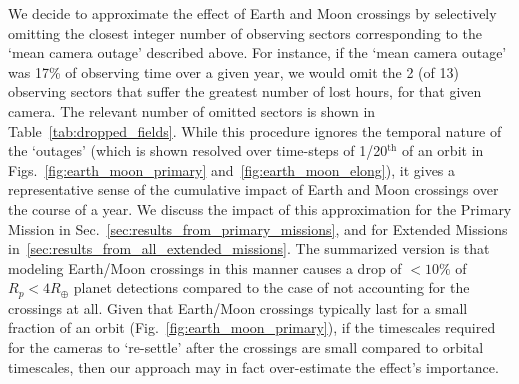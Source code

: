 We decide to approximate the effect of Earth and Moon crossings by selectively omitting the closest integer number of observing sectors corresponding to the `mean camera outage' described above.
For instance, if the `mean camera outage' was 17\% of \tesss observing time over a given year, we would omit the 2 (of 13) observing sectors that suffer the greatest number of lost hours, for that given camera.
The relevant number of omitted sectors is shown in Table~\ref{tab:dropped_fields}.
While this procedure ignores the temporal nature of the `outages' (which is shown resolved over time-steps of 1/20$^\mathrm{th}$ of an orbit in Figs.~\ref{fig:earth_moon_primary} and~\ref{fig:earth_moon_elong}), it gives a representative sense of the cumulative impact of Earth and Moon crossings over the course of a year.
We discuss the impact of this approximation for the Primary Mission in Sec.~\ref{sec:results_from_primary_missions}, and for Extended Missions in~\ref{sec:results_from_all_extended_missions}.
The summarized version is that modeling Earth/Moon crossings in this manner causes a drop of $<10\%$ of $R_p < 4R_\oplus$ planet detections compared to the case of not accounting for the crossings at all.
Given that Earth/Moon crossings typically last for a small fraction of an orbit (Fig.~\ref{fig:earth_moon_primary}), if the timescales required for the cameras to `re-settle' after the crossings are small compared to orbital timescales, then our approach may in fact over-estimate the effect's importance.

